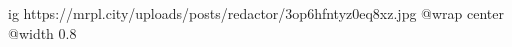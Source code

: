  
 
 
 
 

\ifcmt
  ig https://mrpl.city/uploads/posts/redactor/3op6hfntyz0eq8xz.jpg
  @wrap center
  @width 0.8
\fi
